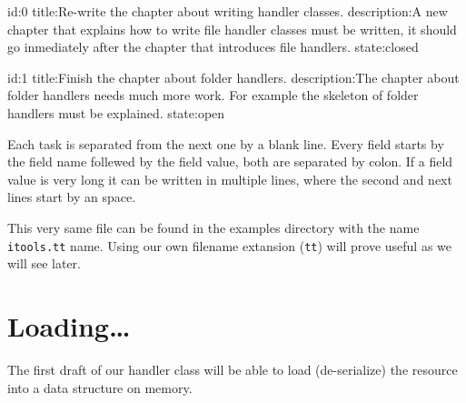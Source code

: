 \begin{code}
    id:0
    title:Re-write the chapter about writing handler classes.
    description:A new chapter that explains how to write file handler
     classes must be written, it should go inmediately after the chapter
     that introduces file handlers.
    state:closed

    id:1
    title:Finish the chapter about folder handlers.
    description:The chapter about folder handlers needs much more work.
     For example the skeleton of folder handlers must be explained.
    state:open
\end{code}

Each task is separated from the next one by a blank line. Every field
starts by the field name follewed by the field value, both are separated
by colon. If a field value is very long it can be written in multiple lines,
where the second and next lines start by an space.

This very same file can be found in the examples directory with the name
{\tt itools.tt} name. Using our own filename extansion ({\tt tt}) will
prove useful as we will see later.


\section{Loading\dots}

The first draft of our handler class will be able to load (de-serialize)
the resource into a data structure on memory.


